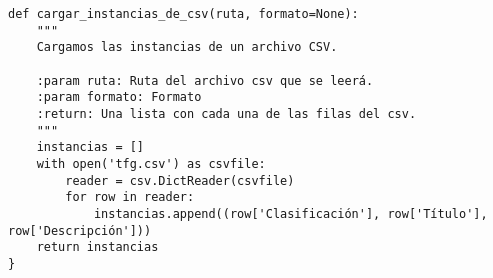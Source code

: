 \lhead{\emph{\ChapterFour{}}}

\lstset{
   language=Python
}

\begin{minipage}{\linewidth}
\begin{lstlisting}[caption=Función para cargar instancias de un archivo CSV.]
def cargar_instancias_de_csv(ruta, formato=None):
    """
    Cargamos las instancias de un archivo CSV.

    :param ruta: Ruta del archivo csv que se leerá.
    :param formato: Formato 
    :return: Una lista con cada una de las filas del csv.
    """
    instancias = []
    with open('tfg.csv') as csvfile:
        reader = csv.DictReader(csvfile)
        for row in reader:
            instancias.append((row['Clasificación'], row['Título'], row['Descripción']))
    return instancias
}
\end{lstlisting}
\end{minipage}